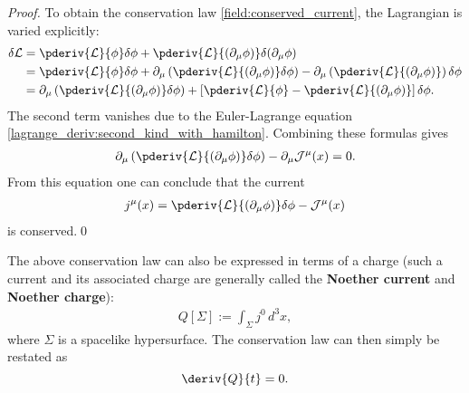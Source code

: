 \begin{theorem}
\begin{mdframed}[roundcorner=10pt, linecolor=blue, linewidth=1pt]
\begin{proof}
                To obtain the conservation law \eqref{field:conserved_current}, the Lagrangian is varied explicitly:
                \begin{align*}
                    \delta\mathcal{L} &= \pderiv{\mathcal{L}}{\phi}\delta\phi + \pderiv{\mathcal{L}}{(\partial_\mu\phi)}\delta(\partial_\mu\phi)\\
                    &= \pderiv{\mathcal{L}}{\phi}\delta\phi + \partial_\mu\left(\pderiv{\mathcal{L}}{(\partial_\mu\phi)}\delta\phi\right) - \partial_\mu\left(\pderiv{\mathcal{L}}{(\partial_\mu\phi)}\right)\delta\phi\\
                    &= \partial_\mu\left(\pderiv{\mathcal{L}}{(\partial_\mu\phi)}\delta\phi\right) + \left[\pderiv{\mathcal{L}}{\phi} - \pderiv{\mathcal{L}}{(\partial_\mu\phi)}\right]\delta\phi.
                \end{align*}
                The second term vanishes due to the Euler-Lagrange equation \eqref{lagrange_deriv:second_kind_with_hamilton}. Combining these formulas gives
                \begin{gather}
                    \partial_\mu\left(\pderiv{\mathcal{L}}{(\partial_\mu\phi)}\delta\phi\right) - \partial_\mu\mathcal{J}^\mu(x) = 0.
                \end{gather}
                From this equation one can conclude that the current
                \begin{gather}
                    j^\mu(x) = \pderiv{\mathcal{L}}{(\partial_\mu\phi)}\delta\phi - \mathcal{J}^\mu(x)
                \end{gather}
                is conserved.\qed
            \end{proof}
        \end{mdframed}
    \end{theorem}
    The above conservation law can also be expressed in terms of a charge (such a current and its associated charge are generally called the \textbf{Noether current} and \textbf{Noether charge}):
    \begin{gather}
        \label{field:noether_charge}
        Q[\Sigma] := \int_\Sigma j^0\,d^3x,
    \end{gather}
    where $\Sigma$ is a spacelike hypersurface. The conservation law can then simply be restated as \[\deriv{Q}{t} = 0.\]

